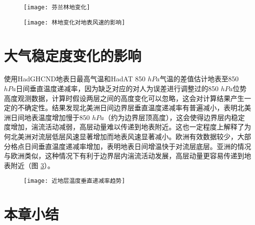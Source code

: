 \begin{figure}[!t]
    \centering
    \texttt{[image: 芬兰林地变化]}
        \label{fig:Finlandwoodlandchange}
\end{figure}

\begin{figure}[!b]
    \centering
    \texttt{[image: 林地变化对地表风速的影响]}
        \label{fig:woodlandonwind}
\end{figure}

\section{大气稳定度变化的影响}

使用HadGHCND地表日最高气温和HadAT 850 $hPa$气温的差值估计地表至850 $hPa$日间垂直温度递减率，因为缺乏对应的对人为误差进行调整过的850 $hPa$位势高度观测数据，计算时假设两层之间的高度变化可以忽略，这会对计算结果产生一定的不确定性。结果发现北美洲日间边界层垂直温度递减率有普遍减小，表明北美洲日间地表温度增加慢于850 $hPa$（约为边界层顶高度），这会使得边界层内稳定度增加，湍流活动减弱，高层动量难以传递到地表附近。这也一定程度上解释了为何北美洲对流层低层风速显著增加而地表风速显著减小。欧洲有效数据较少，大部分格点日间垂直温度递减率增加，表明地表日间增温快于对流层底层。亚洲的情况与欧洲类似，这种情况下有利于边界层内湍流活动发展，高层动量更容易传递到地表附近（图 \ref{fig:lapserate}）。

\begin{figure}[!htbp]
    \centering
    \texttt{[image: 近地层温度垂直递减率趋势]}
        \label{fig:lapserate}
\end{figure}

\section{本章小结}

